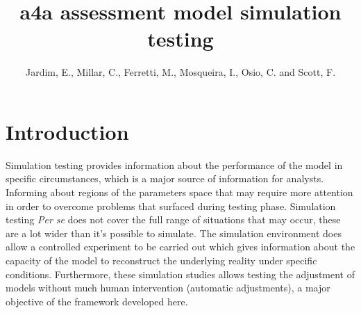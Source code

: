 \documentclass[a4paper]{article}\usepackage{graphicx, color}
\begin{document}
\title{a4a assessment model simulation testing}
\author{Jardim, E., Millar, C., Ferretti, M., Mosqueira, I., Osio, C. and Scott, F.}

\maketitle
\pagebreak
\tableofcontents
\pagebreak

\newpage
\section{Introduction}

Simulation testing provides information about the performance of the model in specific circumstances, which is a major source of information for analysts. Informing about regions of the parameters space that may require more attention in order to overcome problems that surfaced during testing phase. Simulation testing \emph{Per se} does not cover the full range of situations that may occur, these are a lot wider than it's possible to simulate. The simulation environment does allow a controlled experiment to be carried out which gives information about the capacity of the model to reconstruct the underlying reality under specific conditions. Furthermore, these simulation studies allows testing the adjustment of models without much human intervention (automatic adjustments), a major objective of the framework developed here.
\end{document}
